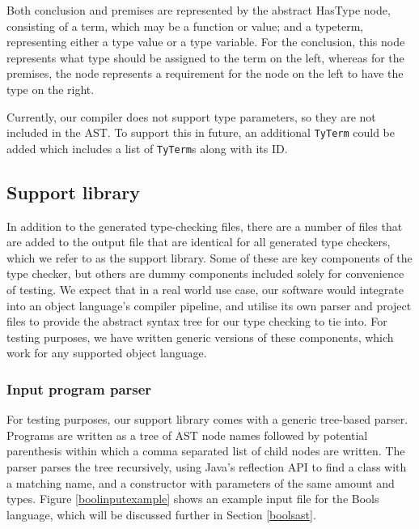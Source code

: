 \documentclass[nofilelist]{cslthse-msc}
\newcommand{\CR}[1]{\textcolor{green!60!black}{[\textbf{CR}:#1]}}
\begin{document}
Both conclusion and premises are represented by the abstract HasType node, consisting of a term, which may be a function or value; and a typeterm, representing either a type value or a type variable.
For the conclusion, this node represents what type should be assigned to the term on the left, whereas for the premises, the node represents a requirement for the node on the left to have the type on the right.

Currently, our compiler does not support type parameters, so they are not included in the AST.
To support this in future, an additional \lstinline{TyTerm} could be added which includes a list of \lstinline{TyTerm}s along with its ID.

\subsection{Support library}
In addition to the generated type-checking files, there are a number of files that are added to the output file that are identical for all generated type checkers, which we refer to as the support library.
Some of these are key components of the type checker, but others are dummy components included solely for convenience of testing.
We expect that in a real world use case, our software would integrate into an object language's compiler pipeline, and utilise its own parser and project files to provide the abstract syntax tree for our type checking to tie into.
For testing purposes, we have written generic versions of these components, which work for any supported object language.

\subsubsection{Input program parser}\label{treebasedparser}
For testing purposes, our support library comes with a generic tree-based parser.
Programs are written as a tree of AST node names followed by potential parenthesis within which a comma separated list of child nodes are written.
The parser parses the tree recursively, using Java's reflection API to find a class with a matching name, and a constructor with parameters of the same amount and types.
Figure \ref{boolinputexample} shows an example input file for the Bools language, which will be discussed further in Section \ref{boolsast}.
\end{document}
